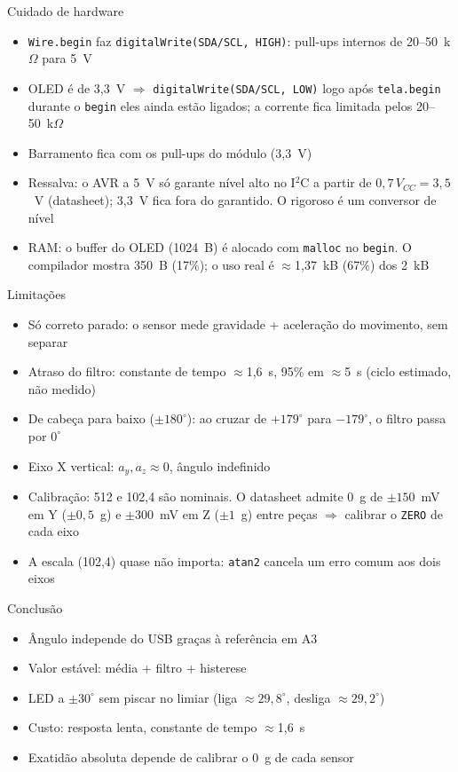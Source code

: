 \documentclass[aspectratio=169]{beamer}
\begin{document}
\begin{frame}{Cuidado de hardware}
\small
\begin{itemize}
  \item \texttt{Wire.begin} faz \texttt{digitalWrite(SDA/SCL, HIGH)}: pull-ups internos de 20--50~k$\Omega$ para 5~V
  \item OLED é de 3,3~V $\Rightarrow$ \texttt{digitalWrite(SDA/SCL, LOW)} logo após \texttt{tela.begin}
    \\ durante o \texttt{begin} eles ainda estão ligados; a corrente fica limitada pelos 20--50~k$\Omega$
  \item Barramento fica com os pull-ups do módulo (3,3~V)
  \item Ressalva: o AVR a 5~V só garante nível alto no I$^2$C a partir de $0{,}7\,V_{CC} = 3{,}5$~V (datasheet);
    3,3~V fica fora do garantido. O rigoroso é um conversor de nível
  \item RAM: o buffer do OLED (1024~B) é alocado com \texttt{malloc} no \texttt{begin}.
    O compilador mostra 350~B (17\%); o uso real é $\approx$1,37~kB (67\%) dos 2~kB
\end{itemize}
\end{frame}

\begin{frame}{Limitações}
\small
\begin{itemize}
  \item Só correto parado: o sensor mede gravidade + aceleração do movimento, sem separar
  \item Atraso do filtro: constante de tempo $\approx$1,6~s, 95\% em $\approx$5~s (ciclo estimado, não medido)
  \item De cabeça para baixo ($\pm180^\circ$): ao cruzar de $+179^\circ$ para $-179^\circ$, o filtro passa por $0^\circ$
  \item Eixo X vertical: $a_y, a_z \approx 0$, ângulo indefinido
  \item Calibração: 512 e 102,4 são nominais. O datasheet admite 0~g de $\pm150$~mV em Y ($\pm0{,}5$~g)
    e $\pm300$~mV em Z ($\pm1$~g) entre peças $\Rightarrow$ calibrar o \texttt{ZERO} de cada eixo
  \item A escala (102,4) quase não importa: \texttt{atan2} cancela um erro comum aos dois eixos
\end{itemize}
\end{frame}

\begin{frame}{Conclusão}
\begin{itemize}
  \item Ângulo independe do USB graças à referência em A3
  \item Valor estável: média + filtro + histerese
  \item LED a $\pm30^\circ$ sem piscar no limiar (liga $\approx29{,}8^\circ$, desliga $\approx29{,}2^\circ$)
  \item Custo: resposta lenta, constante de tempo $\approx$1,6~s
  \item Exatidão absoluta depende de calibrar o 0~g de cada sensor
\end{itemize}
\end{frame}
\end{document}
